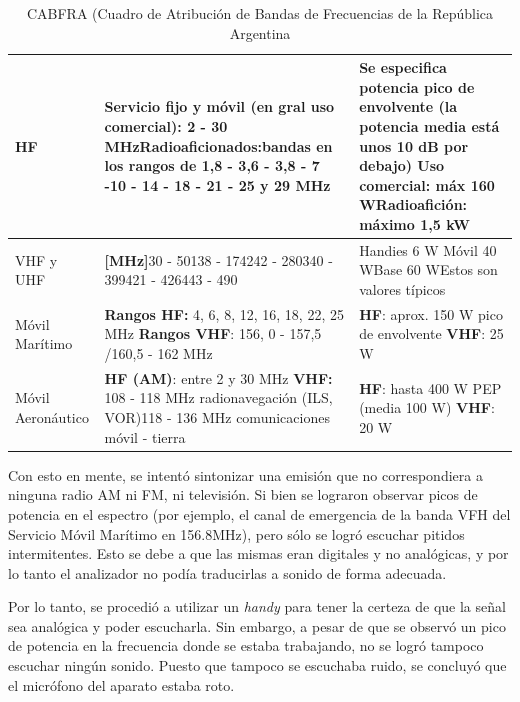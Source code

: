 \documentclass[../../labo_tp5_main.tex]{subfiles}
\begin{document}
\begin{table}[H]
\begin{tabular}{|l|L{6cm}|L{6cm}|}
\hline
HF                  & Servicio fijo y móvil (en gral uso comercial): 2 - 30 MHzRadioaficionados:bandas en los rangos de 1,8 - 3,6 - 3,8 - 7 -10 - 14 - 18 - 21 - 25 y 29 MHz                             & Se especifica potencia pico de envolvente (la potencia media está unos 10 dB por debajo) Uso comercial: máx 160 WRadioafición: máximo 1,5 kW       \\
\hline
VHF y UHF           & \textbf{{[}MHz{]}}30 - 50138 - 174242 - 280340 - 399421 - 426443 - 490                                                                                                                      & Handies 6 W Móvil 40 WBase 60 WEstos son valores típicos                                                                                           \\
\hline
Móvil Marítimo      & \textbf{Rangos HF:} 4, 6, 8, 12, 16, 18, 22, 25 MHz \textbf{Rangos VHF}: 156, 0 - 157,5 /160,5 - 162 MHz                                                                                             & \textbf{HF}: aprox. 150 W pico de envolvente \textbf{VHF}: 25 W                                                                                                      \\
\hline
Móvil Aeronáutico   & \textbf{HF (AM)}: entre 2 y 30 MHz \textbf{VHF:} 108 - 118 MHz radionavegación (ILS, VOR)118 - 136 MHz comunicaciones móvil - tierra                                                                 & \textbf{HF}: hasta 400 W PEP (media 100 W) \textbf{VHF}: 20 W\\
\hline
 
\end{tabular}

\caption{CABFRA (Cuadro de Atribuci\'on de Bandas de Frecuencias de la Rep\'ublica Argentina}
\label{tab:cabfra}
\end{table}

Con esto en mente, se intent\'o sintonizar una emisi\'on que no correspondiera a ninguna radio AM ni FM, ni televisi\'on. Si bien se lograron observar picos de potencia en el espectro (por ejemplo, el canal de emergencia de la banda VFH del Servicio M\'ovil Mar\'itimo en 156.8MHz), pero s\'olo se logr\'o escuchar pitidos intermitentes. Esto se debe a que las mismas eran digitales y no anal\'ogicas, y por lo tanto el analizador no pod\'ia traducirlas a sonido de forma adecuada.\par

Por lo tanto, se procedi\'o a utilizar un \textit{handy} para tener la certeza de que la se\~nal sea anal\'ogica y poder escucharla. Sin embargo, a pesar de que se observ\'o un pico de potencia en la frecuencia donde se estaba trabajando, no se logr\'o tampoco escuchar ning\'un sonido. Puesto que tampoco se escuchaba ruido, se concluy\'o que el micr\'ofono del aparato estaba roto.
\end{document}
